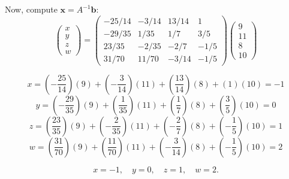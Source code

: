 \documentclass[12pt,a3paper]{article}
\begin{document}
\begin{tcolorbox}
Now, compute $\mathbf{x} = A^{-1}\mathbf{b}$:
\[
\begin{pmatrix} x \\ y \\ z \\ w \end{pmatrix} = 
\begin{pmatrix}
-25/14 & -3/14 & 13/14 & 1 \\
-29/35 & 1/35 & 1/7 & 3/5 \\
23/35 & -2/35 & -2/7 & -1/5 \\
31/70 & 11/70 & -3/14 & -1/5
\end{pmatrix}
\begin{pmatrix} 9 \\ 11 \\ 8 \\ 10 \end{pmatrix}
\]

\[
x = \left(-\frac{25}{14}\right)(9) + \left(-\frac{3}{14}\right)(11) + \left(\frac{13}{14}\right)(8) + (1)(10) = -1
\]
\[
y = \left(-\frac{29}{35}\right)(9) + \left(\frac{1}{35}\right)(11) + \left(\frac{1}{7}\right)(8) + \left(\frac{3}{5}\right)(10) = 0
\]
\[
z = \left(\frac{23}{35}\right)(9) + \left(-\frac{2}{35}\right)(11) + \left(-\frac{2}{7}\right)(8) + \left(-\frac{1}{5}\right)(10) = 1
\]
\[
w = \left(\frac{31}{70}\right)(9) + \left(\frac{11}{70}\right)(11) + \left(-\frac{3}{14}\right)(8) + \left(-\frac{1}{5}\right)(10) = 2
\]

\[
\boxed{x=-1,\quad y=0,\quad z=1,\quad w=2.}
\]

\end{tcolorbox}
\end{document}
